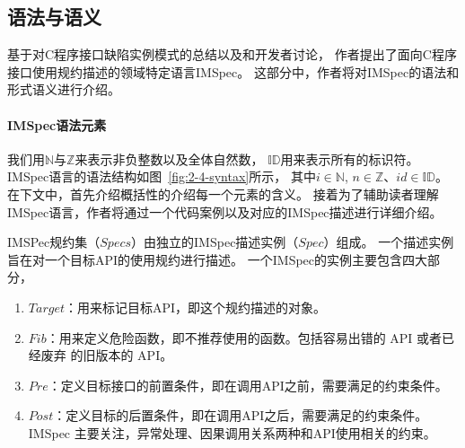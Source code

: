 \newcommand{\Nat}{\mathbb{N}}
\newcommand{\Int}{\mathbb{Z}}
\newcommand{\ID}{\mathbb{ID}}
\newcommand{\Cond}{\mathit{Cond}}
\newcommand{\true}{\texttt{true}}
\newcommand{\Pre}{\mathit{Pre}}
\newcommand{\Post}{\mathit{Post}}
\newcommand{\Fib}{\mathit{Fib}}
\newcommand{\Ret}{\mathit{Return}}
\newcommand{\ReturnFun}[1]{\texttt{\textbf{RETURN}(}#1\texttt{)}}
\newcommand{\Call}{\mathit{Call}}
\newcommand{\CallFun}[1]{\texttt{\textbf{Call}(}#1\texttt{)}}
\newcommand{\NULL}{\texttt{\textbf{NULL}}}
\newcommand{\FunName}{\mathit{FunName}}
\newcommand{\FunSig}{\mathit{FunSig}}
\newcommand{\Action}{\mathit{Action}}
\newcommand{\Arg}{\mathit{Arg}}
\newcommand{\Opd}{\mathit{Opd}}
\newcommand{\MemberOp}{\mathit{MemberOp}}
\newcommand{\CmpOp}{\mathit{CmpOp}}
\newcommand{\UnOp}{\mathit{UnOp}}
\newcommand{\Set}{\mathit{Set}}
\newcommand{\Type}{\mathit{Type}}
\newcommand{\IN}{\texttt{IN}}
\newcommand{\NOTIN}{\texttt{NOTIN}}
\newcommand{\LEN}{\texttt{LEN}}
\newcommand{\TYPE}{\texttt{TYPE}}
\newcommand{\MEMTYPE}{\texttt{MEMTYPE}}
\newcommand{\myid}{\mathit{id}}
\newcommand{\Target}{\mathit{Target}}
\newcommand{\Spec}{\mathit{Spec}}
\newcommand{\Specs}{\mathit{Specs}}

\subsection{语法与语义}
基于对C程序接口缺陷实例模式的总结以及和开发者讨论，
作者提出了面向C程序接口使用规约描述的领域特定语言IMSpec。
这部分中，作者将对IMSpec的语法和形式语义进行介绍。

\paragraph{IMSpec语法元素}
我们用$\Nat$与$\Int$来表示非负整数以及全体自然数，
$\ID$用来表示所有的标识符。
IMSpec语言的语法结构如图~\ref{fig:2-4-syntax}所示，
其中$i\in\Nat$, $n\in\Int$、$id \in \ID$。
在下文中，首先介绍概括性的介绍每一个元素的含义。
接着为了辅助读者理解IMSpec语言，作者将通过一个代码案例以及对应的IMSpec描述进行详细介绍。

IMSPec规约集（$\Specs$）由独立的IMSpec描述实例（$\Spec$）组成。
一个描述实例旨在对一个目标API的使用规约进行描述。
一个IMSpec的实例主要包含四大部分，
\begin{enumerate}
	\item $\Target$：用来标记目标API，即这个规约描述的对象。
	\item $\Fib$：用来定义危险函数，即不推荐使用的函数。包括容易出错的 API 或者已经废弃
	的旧版本的 API。
	\item $\Pre$：定义目标接口的前置条件，即在调用API之前，需要满足的约束条件。
	\item $\Post$：定义目标的后置条件，即在调用API之后，需要满足的约束条件。IMSpec
	主要关注，异常处理、因果调用关系两种和API使用相关的约束。
\end{enumerate}

